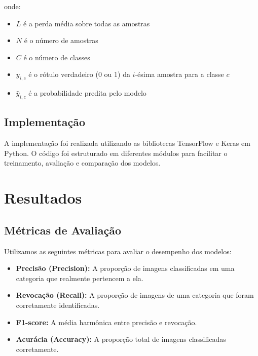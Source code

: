\documentclass{article}
\begin{document}
                        onde:
                        \begin{itemize}
                            \item $L$ \'e a perda m\'edia sobre todas as amostras
                                \item $N$ \'e o n\'umero de amostras
                                    \item $C$ \'e o n\'umero de classes
                                        \item $y_{i,c}$ \'e o r\'otulo verdadeiro (0 ou 1) da $i$-\'esima amostra para a classe $c$
                                            \item $\hat{y}_{i,c}$ \'e a probabilidade predita pelo modelo
                                            \end{itemize}

                                            \subsection{Implementa\c{c}\~ao}
                                            A implementa\c{c}\~ao foi realizada utilizando as bibliotecas TensorFlow e Keras em Python. O c\'odigo foi estruturado em diferentes m\'odulos para facilitar o treinamento, avalia\c{c}\~ao e compara\c{c}\~ao dos modelos.

                                            \section{Resultados}

                                            \subsection{M\'etricas de Avalia\c{c}\~ao}
                                            Utilizamos as seguintes m\'etricas para avaliar o desempenho dos modelos:
                                            \begin{itemize}
                                                \item \textbf{Precis\~ao (Precision):} A propor\c{c}\~ao de imagens classificadas em uma categoria que realmente pertencem a ela.
                                                    \item \textbf{Revoca\c{c}\~ao (Recall):} A propor\c{c}\~ao de imagens de uma categoria que foram corretamente identificadas.
                                                        \item \textbf{F1-score:} A m\'edia harm\^onica entre precis\~ao e revoca\c{c}\~ao.
                                                            \item \textbf{Acur\'acia (Accuracy):} A propor\c{c}\~ao total de imagens classificadas corretamente.
                                                            \end{itemize}
\end{document}
